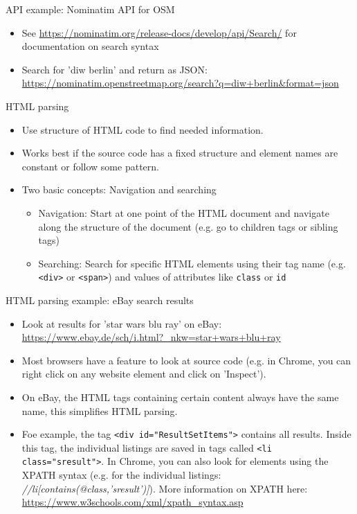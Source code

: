 \begin{frame}{API example: Nominatim API for OSM}
\begin{itemize}
	\item See \url{https://nominatim.org/release-docs/develop/api/Search/} for documentation on search syntax
	\item Search for 'diw berlin' and return as JSON: \url{https://nominatim.openstreetmap.org/search?q=diw+berlin&format=json}
\end{itemize}

\end{frame}

\begin{frame}{HTML parsing}
\begin{itemize}
	\item Use structure of HTML code to find needed information.
	\item Works best if the source code has a fixed structure and element names are constant or follow some pattern.
	\item Two basic concepts: Navigation and searching
	\begin{itemize}
		\item Navigation: Start at one point of the HTML document and navigate along the structure of the document (e.g. go to children tags or sibling tags)
		\item Searching: Search for specific HTML elements using their tag name (e.g. \texttt{<div>} or \texttt{<span>}) and values of attributes like \texttt{class} or \texttt{id}
	\end{itemize}
\end{itemize}
\end{frame}

\begin{frame}{HTML parsing example: eBay search results}
\begin{itemize}
	\item Look at results for 'star wars blu ray' on eBay: \url{https://www.ebay.de/sch/i.html?_nkw=star+wars+blu+ray}
	\item Most browsers have a feature to look at source code (e.g. in Chrome, you can right click on any website element and click on 'Inspect').
	\item On eBay, the HTML tags containing certain content always have the same name, this simplifies HTML parsing.
	\item Foe example, the tag \texttt{<div id="ResultSetItems">} contains all results. Inside this tag, the individual listings are saved in tags called \texttt{<li class="sresult">}. In Chrome, you can also look for elements using the XPATH syntax (e.g. for the individual listings: \textit{//li[contains(@class,'sresult')]}). More information on XPATH here: \url{https://www.w3schools.com/xml/xpath_syntax.asp}
\end{itemize}
\end{frame}

